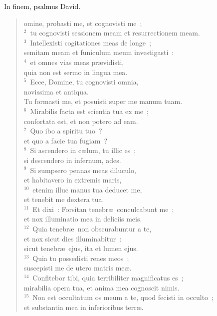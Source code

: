 \bchapter[Psalm]
In finem, psalmus David. \begin{verse}omine, probasti me, et cognovisti me~;\\
${}^{2}$~tu cognovisti sessionem meam et resurrectionem meam.\\
${}^{3}$~Intellexisti cogitationes meas de longe~;\\ semitam meam et funiculum meum investigasti~:\\
${}^{4}$~et omnes vias meas pr\ae vidisti,\\ quia non est sermo in lingua mea.\\
${}^{5}$~Ecce, Domine, tu cognovisti omnia,\\ novissima et antiqua.\\ Tu formasti me, et posuisti super me manum tuam.\\
${}^{6}$~Mirabilis facta est scientia tua ex me~;\\ confortata est, et non potero ad eam.\\
${}^{7}$~Quo ibo a spiritu tuo~?\\ et quo a facie tua fugiam~?\\
${}^{8}$~Si ascendero in c\ae lum, tu illic es~;\\ si descendero in infernum, ades.\\
${}^{9}$~Si sumpsero pennas meas diluculo,\\ et habitavero in extremis maris,\\
${}^{10}$~etenim illuc manus tua deducet me,\\ et tenebit me dextera tua.\\
${}^{11}$~Et dixi~: Forsitan tenebr\ae\ conculcabunt me~;\\ et nox illuminatio mea in deliciis meis.\\
${}^{12}$~Quia tenebr\ae\ non obscurabuntur a te,\\ et nox sicut dies illuminabitur~:\\ sicut tenebr\ae\ ejus, ita et lumen ejus.\\
${}^{13}$~Quia tu possedisti renes meos~;\\ suscepisti me de utero matris me\ae .\\
${}^{14}$~Confitebor tibi, quia terribiliter magnificatus es~;\\ mirabilia opera tua, et anima mea cognoscit nimis.\\
${}^{15}$~Non est occultatum os meum a te, quod fecisti in occulto~;\\ et substantia mea in inferioribus terr\ae .\\

\end{verse}
